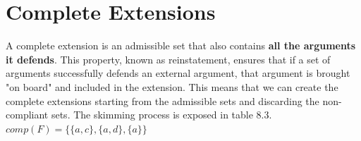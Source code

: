 \documentclass{scrbook}
\begin{document}
\section{Complete Extensions}

A complete extension is an admissible set that also contains \textbf{all the arguments it defends}. This property, known as reinstatement, ensures that if a set of arguments successfully defends an external argument, that argument is brought "on board" and included in the extension. This means that we can create the complete extensions starting from the admissible sets and discarding the non-compliant sets. The skimming process is exposed in table 8.3.\\

$comp(F) = \{\{a,c\},\{a,d\},\{a\}\}$ \\
\end{document}
